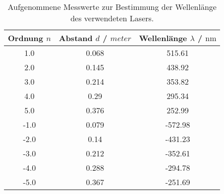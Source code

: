 \begin{table}
\centering
\begin{tabular}{ccc}
\toprule
Ordnung $n$ & Abstand $d$ / $\si{meter}$ & Wellenlänge $\lambda$ / $\si{\nano\meter}$ \\
\midrule
1.0 & 0.068 & 515.61 \\
2.0 & 0.145 & 438.92 \\
3.0 & 0.214 & 353.82 \\
4.0 & 0.29 & 295.34 \\
5.0 & 0.376 & 252.99 \\
-1.0 & 0.079 & -572.98 \\
-2.0 & 0.14 & -431.23 \\
-3.0 & 0.212 & -352.61 \\
-4.0 & 0.288 & -294.78 \\
-5.0 & 0.367 & -251.69 \\
\end{tabular}
\caption{Aufgenommene Messwerte zur Bestimmung der Wellenlänge des verwendeten Lasers.}
\label{tab:welle}
\end{table}
